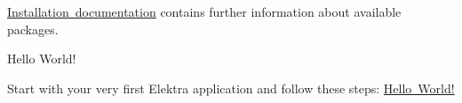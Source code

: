 \begin{DoxyCode}{0}
\end{DoxyCode}


\mbox{\hyperlink{doc_INSTALL_md}{Installation documentation}} contains further information about available packages.


\begin{DoxyItemize}
\item Hello World!

Start with your very first Elektra application and follow these steps\+: \mbox{\hyperlink{doc_tutorials_hello-elektra_md}{Hello World!}} 
\end{DoxyItemize}